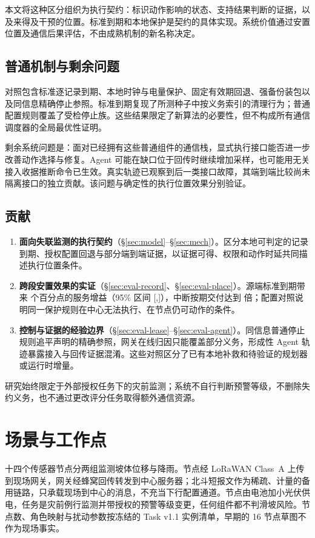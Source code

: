 \documentclass[11pt]{article}
\begin{document}
本文将这种区分组织为执行契约：标识动作影响的状态、支持结果判断的证据，以及来得及干预的位置。标准到期和本地保护是契约的具体实现。系统价值通过安置位置及通信后果评估，不由成熟机制的新名称决定。

\subsection{普通机制与剩余问题}
对照包含标准逐记录到期、本地时钟与电量保护、固定有效期回退、强备份装包以及同信息精确停止参照。标准到期复现了所测种子中按义务索引的清理行为；普通配置规则覆盖了受检停止族。这些结果限定了新算法的必要性，但不构成所有通信调度器的全局最优性证明。

剩余系统问题是：面对已经拥有这些普通组件的通信栈，显式执行接口能否进一步改善动作选择与修复。Agent 可能在缺口位于回传时继续增加采样，也可能用无关接入收据推断命令已生效。真实轨迹已观察到后一类接口故障，其端到端比较尚未隔离接口的独立贡献。该问题与确定性的执行位置效果分别验证。

\subsection{贡献}
\begin{enumerate}
\item \textbf{面向失联监测的执行契约}（\S\ref{sec:model}--\S\ref{sec:mech}）。区分本地可判定的记录到期、授权配置回退与部分端到端证据，以证据可得、权限和动作时延共同描述执行位置条件。
\item \textbf{跨段安置效果的实证}（\S\ref{sec:eval-record}、\S\ref{sec:eval-place}）。源端标准到期带来 \cThreePairedPoints 个百分点的服务增益（95\% 区间 [\cThreePairedLo,\cThreePairedHi]），中断按期交付达到 \cThreeRatio 倍；配置对照说明同一保护规则在中心无法执行、在节点仍可动作的条件。
\item \textbf{控制与证据的经验边界}（\S\ref{sec:eval-lease}--\S\ref{sec:eval-agent}）。同信息普通停止规则追平声明的精确参照，网关在线归因只能覆盖部分义务，形成性 Agent 轨迹暴露接入与回传证据混淆。这些对照区分了已有本地补救和待验证的规划器或运行时增量。
\end{enumerate}
研究始终限定于外部授权任务下的灾前监测；系统不自行判断预警等级，不删除失约义务，也不通过更改评分任务取得额外通信资源。

\section{场景与工作点}
\label{sec:bg}

十四个传感器节点分两组监测坡体位移与降雨。节点经 LoRaWAN Class~A 上传到现场网关，网关经蜂窝回传转发到中心服务器；北斗短报文作为稀疏、计量的备用链路，只承载现场到中心的消息，不充当下行配置通道。节点由电池加小光伏供电，任务是灾前例行监测并带授权的预警等级变更，任何组件都不判滑坡风险。节点数、角色映射与扰动参数按冻结的 Task v1.1 实例清单，早期的 16 节点草图不作为现场事实。
\end{document}
